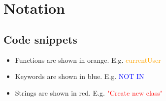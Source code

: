 \newpage
\section{Notation}

\subsection{Code snippets}

\begin{itemize}
    \item Functions are shown in orange. E.g. \textcolor{orange}{currentUser}
    \item Keywords are shown in blue. E.g. \textcolor{blue}{NOT IN}
    \item Strings are shown in red. E.g. \textcolor{red}{"Create new class"}
\end{itemize}
